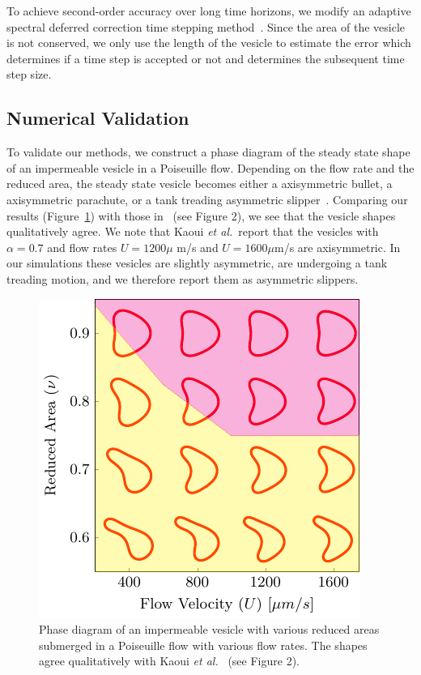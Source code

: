 \documentclass[9pt,twocolumn,twoside,lineno]{pnas-new}
\newif\ifTikz
\begin{document}
To achieve second-order accuracy over long time horizons, we modify an
adaptive spectral deferred correction time stepping
method~\cite{qua-bir2016}. Since the area of the vesicle is not
conserved, we only use the length of the vesicle to estimate the error
which determines if a time step is accepted or not and determines the
subsequent time step size.

\subsection*{Numerical Validation}
To validate our methods, we construct a phase diagram of the steady
state shape of an impermeable vesicle in a Poiseuille flow. Depending on
the flow rate and the reduced area, the steady state vesicle becomes
either a axisymmetric bullet, a axisymmetric parachute, or a tank
treading asymmetric slipper~\cite{kao-bir-mis2009}. Comparing our
results (Figure~\ref{fig:PoiseuillePhase}) with those
in~\cite{kao-bir-mis2009} (see Figure 2), we see that the vesicle shapes
qualitatively agree. We note that Kaoui {\em et al.}~report that the
vesicles with $\alpha=0.7$ and flow rates $U = 1200 \mu$ m/s and $U =
1600 \mu$m/s are axisymmetric.  In our simulations these vesicles are
slightly asymmetric, are undergoing a tank treading motion, and we
therefore report them as asymmetric slippers.
\begin{figure}[htp]
  \centering
  \ifTikz
  
  \else
  \includegraphics{figures/parabolicImpermeable.pdf}
  \fi
  \caption{\label{fig:PoiseuillePhase} Phase diagram of an impermeable
  vesicle with various reduced areas submerged in a Poiseuille flow with
  various flow rates. The shapes agree qualitatively with Kaoui {\em et
  al.}~\cite{kao-bir-mis2009} (see Figure 2).}
\end{figure}
\end{document}
